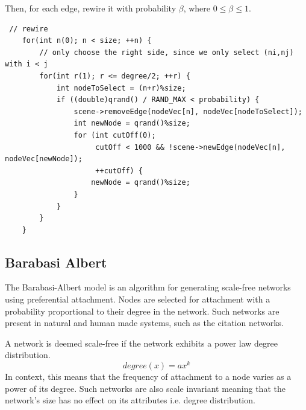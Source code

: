 \documentclass[a4paper,11pt,titlepage]{article}
\begin{document}
Then, for each edge, rewire it with probability $\beta$, where $0 \leq  \beta \leq 1$.
\begin{lstlisting}
 // rewire
    for(int n(0); n < size; ++n) {
        // only choose the right side, since we only select (ni,nj) with i < j
        for(int r(1); r <= degree/2; ++r) {
            int nodeToSelect = (n+r)%size;
            if ((double)qrand() / RAND_MAX < probability) {
                scene->removeEdge(nodeVec[n], nodeVec[nodeToSelect]);
                int newNode = qrand()%size;
                for (int cutOff(0);
                     cutOff < 1000 && !scene->newEdge(nodeVec[n], 					    nodeVec[newNode]);
                     ++cutOff) {
                    newNode = qrand()%size;
                }
            }
        }
    }
\end{lstlisting}

\subsection{Barabasi Albert}

The Barabasi-Albert model is an algorithm for generating scale-free networks
using preferential attachment. Nodes are selected for attachment with a
probability proportional to their
degree in the network.  Such networks are present in natural and human
made systems, such as the citation networks. 

A network is deemed scale-free if the network exhibits a power law degree
distribution. 
\[
degree(x) = ax^k
 \] 
In context, this means that the frequency of attachment to a node
varies as a power of its degree. Such networks are also scale invariant meaning
that the network's size has no effect on its attributes i.e. degree
distribution.
\end{document}
